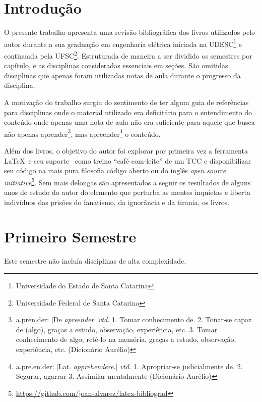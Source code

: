 \documentclass[
	12pt,				%
	openright,			%
	oneside,			%
	a4paper,			%
	english,			%
	french,				%
	spanish,			%
	brazil				%
	]{abntex2}
\begin{document}
\chapter*[Introdução]{Introdução} %
O presente trabalho apresenta uma revisão bibliográfica dos livros utilizados pelo autor durante a sua graduação em engenharia elétrica iniciada na UDESC\footnote{Universidade do Estado de Santa Catarina} e continuada pela UFSC\footnote{Universidade Federal de Santa Catarina}. Estruturada de maneira a ser dividido os semestres por capítulo, e as disciplinas consideradas essenciais em seções. São omitidas disciplinas que apenas foram utilizadas notas de aula durante o progresso da disciplina.\par
A motivação do trabalho surgiu do sentimento de ter algum guia de referências para disciplinas onde o material utilizado era deficitário para o entendimento do conteúdo onde apenas uma nota de aula não era suficiente para aquele que busca não apenas aprender\footnote{a.pren.der: [De \textit{apreender}] \textit{vtd}. 1. Tomar conhecimento de. 2. Tonar-se capaz de (algo), graças a estudo, observação, experiência, etc. 3. Tomar conhecimento de algo, retê-lo na memória, graças a
estudo, observação, experiência, etc. (Dicionário Aurélio)}, mas apreender\footnote{a.pre.en.der: [Lat. \textit{apprehendere}.] \textit{vtd}. 1. Apropriar-se judicialmente de. 2. Segurar, agarrar 3. Assimilar mentalmente (Dicionário Aurélio)} o conteúdo.\par
Além dos livros, o objetivo do autor foi explorar por primeira vez a ferramenta \LaTeX\ e seu suporte \abnTeX\ como treino “café-com-leite” de um TCC e disponibilizar seu código na mais pura filosofia código aberto ou do inglês \textit{open source initiative}\footnote{\url{https://github.com/joan-alvarez/latex-bibliograd}}.
Sem mais delongas são apresentados a seguir os resultados de alguns anos de estudo do autor do elemento que perturba as mentes inquietas e liberta indivíduos das prisões do fanatismo, da ignorância e da tirania, os livros.

\chapter{Primeiro Semestre}\label{cap:1sem}
Este semestre não incluía disciplinas de alta complexidade.
\end{document}
